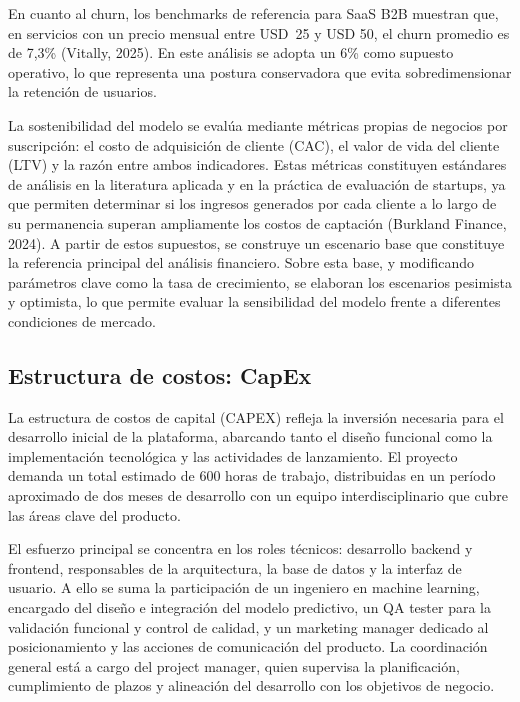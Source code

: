 En cuanto al churn, los benchmarks de referencia para SaaS B2B muestran que, en servicios con un precio mensual entre USD~25 y USD 50, el churn promedio es de 7,3\% (Vitally, 2025). En este análisis se adopta un 6\% como supuesto operativo, lo que representa una postura conservadora que evita sobredimensionar la retención de usuarios.



La sostenibilidad del modelo se evalúa mediante métricas propias de negocios por suscripción: el costo de adquisición de cliente (CAC), el valor de vida del cliente (LTV) y la razón entre ambos indicadores. Estas métricas constituyen estándares de análisis en la literatura aplicada y en la práctica de evaluación de startups, ya que permiten determinar si los ingresos generados por cada cliente a lo largo de su permanencia superan ampliamente los costos de captación (Burkland Finance, 2024). A partir de estos supuestos, se construye un escenario base que constituye la referencia principal del análisis financiero. Sobre esta base, y modificando parámetros clave como la tasa de crecimiento, se elaboran los escenarios pesimista y optimista, lo que permite evaluar la sensibilidad del modelo frente a diferentes condiciones de mercado.



\subsection{Estructura de costos: CapEx}
La estructura de costos de capital (CAPEX) refleja la inversión necesaria para el desarrollo inicial de la plataforma, abarcando tanto el diseño funcional como la implementación tecnológica y las actividades de lanzamiento. El proyecto demanda un total estimado de 600 horas de trabajo, distribuidas en un período aproximado de dos meses de desarrollo con un equipo interdisciplinario que cubre las áreas clave del producto.

El esfuerzo principal se concentra en los roles técnicos: desarrollo backend y frontend, responsables de la arquitectura, la base de datos y la interfaz de usuario. A ello se suma la participación de un ingeniero en machine learning, encargado del diseño e integración del modelo predictivo, un QA tester para la validación funcional y control de calidad, y un marketing manager dedicado al posicionamiento y las acciones de comunicación del producto. La coordinación general está a cargo del project manager, quien supervisa la planificación, cumplimiento de plazos y alineación del desarrollo con los objetivos de negocio.

